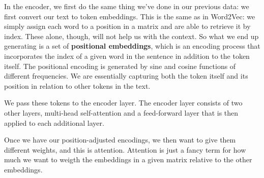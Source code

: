 \documentclass[11pt]{diazessay} %
\begin{document}

In the encoder, we first do the same thing we've done in our previous data: we first convert our text to token embeddings. This is the same as in Word2Vec: we simply assign each word to a position in a matrix and are able to retrieve it by index. These alone, though, will not help us with the context. So what we end up generating is a set of \textbf{positional embeddings}, which is an encoding process that incorporates the index of a given word in the sentence in addition to the token itself. The positional encoding is generated by sine and cosine functions of different frequencies. We are essentially capturing both the token itself and its position in relation to other tokens in the text. 

We pass these tokens to the encoder layer. The encoder layer consists of two other layers, multi-head self-attention and a feed-forward layer that is then applied to each additional layer. 

Once we have our position-adjusted encodings, we then want to give them different weights, and this is attention. Attention is just a fancy term for how much we want to weigth the embeddings in a given matrix relative to the other embeddings. 
\end{document}

